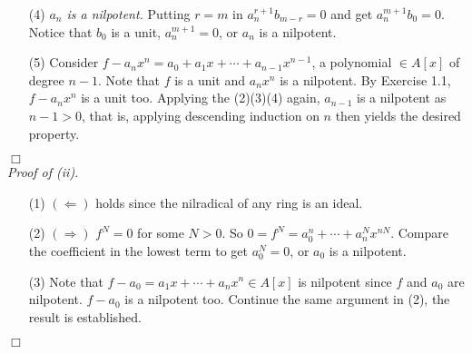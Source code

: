 \documentclass{article}
\begin{document}
\begin{enumerate}
\item[(4)]
  \emph{$a_n$ is a nilpotent.}
  Putting $r = m$ in $a_n^{r+1} b_{m-r} = 0$ and get $a_n^{m+1} b_0 = 0$.
  Notice that $b_0$ is a unit, $a_n^{m+1} = 0$, or $a_n$ is a nilpotent.

\item[(5)]
  Consider $f - a_n x^n = a_0 + a_1 x + \cdots + a_{n-1} x^{n-1}$,
  a polynomial $\in A[x]$ of degree $n-1$.
  Note that $f$ is a unit and $a_n x^n$ is a nilpotent.
  By Exercise 1.1, $f - a_n x^n$ is a unit too.
  Applying the (2)(3)(4) again, $a_{n-1}$ is a nilpotent as $n-1 > 0$,
  that is, applying descending induction on $n$ then yields the desired property.
\end{enumerate}
$\Box$ \\



\emph{Proof of (ii).}
\begin{enumerate}
\item[(1)]
  $(\Longleftarrow)$ holds since the nilradical of any ring is an ideal.

\item[(2)]
  $(\Longrightarrow)$ $f^N = 0$ for some $N > 0$.
  So $0 = f^N = a_0^n + \cdots + a_n^N x^{nN}$.
  Compare the coefficient in the lowest term to get $a_0^N = 0$,
  or $a_0$ is a nilpotent.

\item[(3)]
  Note that $f - a_0= a_1 x + \cdots + a_n x^n \in A[x]$ is nilpotent
  since $f$ and $a_0$ are nilpotent.
  $f - a_0$ is a nilpotent too.
  Continue the same argument in (2), the result is established.
\end{enumerate}
$\Box$ \\
\end{document}
